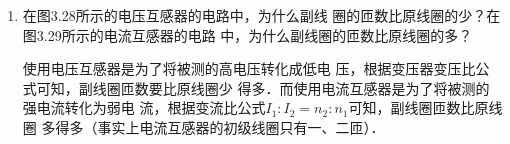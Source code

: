 \begin{enumerate}
\begin{solution}
    设原线圈匝数为$n_1$, 副线圈匝数为$n_2$, 原线圈电压
    为$U_1$, 副线圈电压为$U_2$. 根据变压比公式$\dfrac{U_1}{U_2}=\dfrac{n_1}{n_2}$，
    可得
\[n_1=\frac{U_1}{U_2}\cdot n_2=\frac{220}{55}\x 400=1600\text{（匝）}\]

\end{solution}

\item 在图3.28所示的电压互感器的电路中，为什么副线
圈的匝数比原线圈的少？在图3.29所示的电流互感器的电路
中，为什么副线圈的匝数比原线圈的多？


\begin{solution}
使用电压互感器是为了将被测的高电压转化成低电
压，根据变压器变压比公式可知，副线圈匝数要比原线圈少
得多．而使用电流互感器是为了将被测的强电流转化为弱电
流，根据变流比公式$I_1:I_2=n_2:n_1$可知，副线圈匝数比原线圈
多得多（事实上电流互感器的初级线圈只有一、二匝）．
\end{solution}

\end{enumerate}



